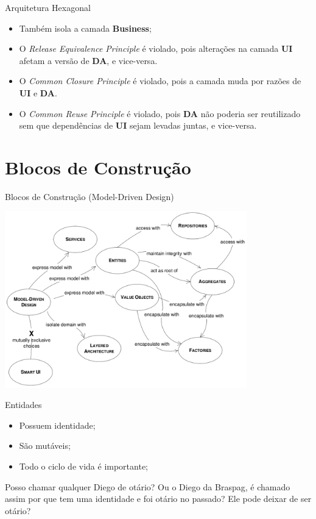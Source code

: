 \documentclass[aspectratio=169]{beamer}
\begin{document}
\begin{frame}{Arquitetura Hexagonal}			
	\begin{itemize}	
		\item Também isola a camada \textbf{Business};
		\item O \textit{Release Equivalence Principle} é violado, pois  alterações na camada \textbf{UI} afetam a versão de \textbf{DA}, e vice-versa. 
		\item O \textit{Common Closure Principle} é violado, pois a camada muda por razões de \textbf{UI} e \textbf{DA}. 
		\item O \textit{Common Reuse Principle} é violado, pois \textbf{DA} não poderia ser reutilizado sem que dependências de \textbf{UI} sejam levadas juntas, e vice-versa.
	\end{itemize}
\end{frame}

\section{Blocos de Construção}
\begin{frame}{Blocos de Construção (Model-Driven Design)}	
	\begin{center}
		\includegraphics[width=10.5cm]{imgs/building_blocks}
	\end{center}
\end{frame}

\begin{frame}{Entidades}	
	\begin{itemize}	
		\item Possuem identidade;
		\item São mutáveis;
		\item Todo o ciclo de vida é importante;
	\end{itemize}

	Posso chamar qualquer Diego de otário? Ou o Diego da Braspag, é chamado assim por que tem uma identidade e foi otário no passado? Ele pode deixar de ser otário?
\end{frame}
\end{document}
